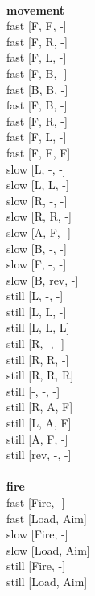 \ \\ {\bf movement } \\
fast [F, F, -] \\
fast [F, R, -] \\
fast [F, L, -] \\
fast [F, B, -] \\
fast [B, B, -] \\
fast [F, B, -] \\
fast [F, R, -] \\
fast [F, L, -] \\
fast [F, F, F] \\
slow [L, -, -] \\
slow [L, L, -] \\
slow [R, -, -] \\
slow [R, R, -] \\
slow [A, F, -] \\
slow [B, -, -] \\
slow [F, -, -] \\
slow [B, rev, -] \\
still [L, -, -] \\
still [L, L, -] \\
still [L, L, L] \\
still [R, -, -] \\
still [R, R, -] \\
still [R, R, R] \\
still [-, -, -] \\
still [R, A, F] \\
still [L, A, F] \\
still [A, F, -] \\
still [rev, -, -] \\
\ \\ {\bf fire } \\
fast [Fire, -] \\
fast [Load, Aim] \\
slow [Fire, -] \\
slow [Load, Aim] \\
still [Fire, -] \\
still [Load, Aim] \\


